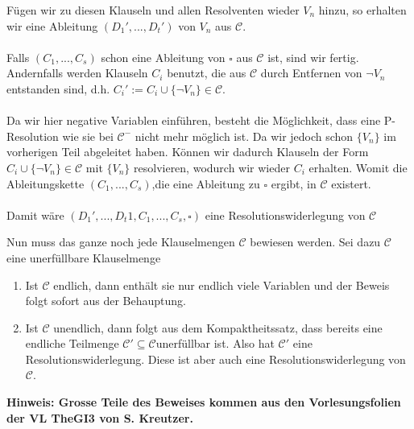 \documentclass[a4paper,10pt]{article}
\begin{document}
\begin{itemize}
		Fügen wir zu diesen Klauseln und allen Resolventen wieder $V_n$ hinzu, so erhalten wir eine Ableitung $(D_1',...,D_t')$ von $V_n$ aus $\mathcal{C}$. \\
		 \ \\
		 Falls $(C_1,..., C_s)$ schon eine Ableitung von $\square$ aus $\mathcal{C}$ ist, sind wir fertig. Andernfalls werden Klauseln $C_i$ benutzt, die aus $\mathcal{C}$ durch Entfernen von $\lnot V_n$ entstanden sind, d.h. $C_i' := C_i \cup \{\lnot V_n \} \in \mathcal{C}$. \\
		\ \\
		Da wir hier negative Variablen einführen, besteht die Möglichkeit, dass eine P-Resolution wie sie bei $\mathcal{C}^-$ nicht mehr möglich ist. Da wir jedoch schon $\{V_n\}$ im vorherigen Teil abgeleitet haben. Können wir dadurch Klauseln der Form $ C_i \cup \{\lnot V_n \} \in \mathcal{C}$ mit $\{V_n\}$ resolvieren, wodurch wir wieder $C_i$ erhalten. Womit die Ableitungskette $(C_1,...,C_s)$,die eine Ableitung zu $\square$ ergibt, in $\mathcal{C}$ existert.  \\
		\ \\
		Damit wäre $(D_1',...,D_t1,C_1,...,C_s,\square)$ eine Resolutionswiderlegung von $\mathcal{C}$ 
\end{itemize}
Nun muss das ganze noch jede Klauselmengen $\mathcal{C}$ bewiesen werden. Sei dazu $\mathcal{C}$ eine unerfüllbare Klauselmenge
\begin{enumerate}
	\item Ist $\mathcal{C}$ endlich, dann enthält sie nur endlich viele Variablen und der Beweis folgt sofort aus der Behauptung. 
	\item Ist $\mathcal{C}$ unendlich, dann folgt aus dem Kompaktheitssatz, dass bereits eine endliche Teilmenge $\mathcal{C}'\subseteq \mathcal{C} $unerfüllbar ist. Also hat $\mathcal{C}'$ eine Resolutionswiderlegung. Diese ist aber auch eine Resolutionswiderlegung von $\mathcal{C}$.

\end{enumerate}
\begin{center}\textbf{Hinweis: Grosse Teile des Beweises kommen aus den Vorlesungsfolien der VL TheGI3 von S. Kreutzer. }\end{center}
\end{document}

